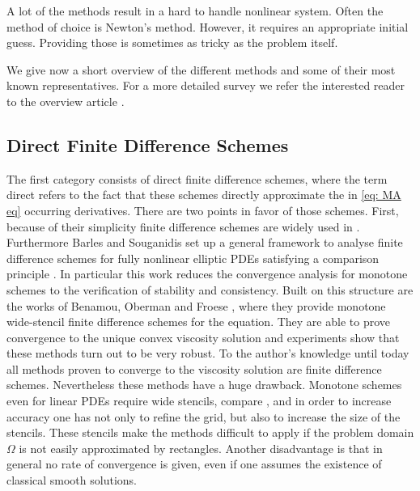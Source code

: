 A lot of the methods result in a hard to handle nonlinear system. Often the method of choice is Newton's method. However, it requires an appropriate initial guess. Providing those is sometimes as tricky as the problem itself.

We give now a short overview of the different methods and some of their most known representatives. For a more detailed survey we refer the interested reader to the overview article \cite{FGN2013}.


\subsection{Direct Finite Difference Schemes}

The first category consists of direct finite difference schemes, where the term direct refers to the fact that these schemes directly approximate the in \eqref{eq: MA eq} occurring derivatives. 
There are two points in favor of those schemes. First, because of their simplicity finite difference schemes are widely used in . Furthermore Barles and Souganidis set up a general framework to analyse finite difference schemes for fully nonlinear elliptic PDEs satisfying a comparison principle \cite{BS1991}. In particular this work reduces the convergence analysis for monotone schemes to the verification of stability and consistency.
Built on this structure are the works of Benamou, Oberman and Froese \cite{BFO2010, Oberman2008, FO2011}, where they provide monotone wide-stencil finite difference schemes for the \MA equation.
They are able to prove convergence to the unique convex viscosity solution and experiments show that these methods turn out to be very robust. To the author's knowledge until today all methods proven to converge to the viscosity solution are finite difference schemes.
Nevertheless these methods have a huge drawback. Monotone schemes even for linear PDEs require wide stencils, compare \cite{MW1953}, and in order to increase accuracy one has not only to refine the grid, but also to increase the size of the stencils. These stencils make the methods difficult to apply if the problem domain $\Omega$ is not easily approximated by rectangles. Another disadvantage is that in general no rate of convergence is given, even if one assumes the existence of classical smooth solutions.

